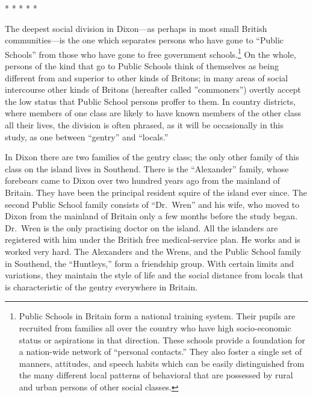 \documentclass[twoside,symmetric,nobib,justified]{tufte-book}
\begin{document}
\vspace{.2in}
\begin{centering}

\Large{* * * * *}

\end{centering}
\vspace{.17in}

\noindent The deepest social division in Dixon---as perhaps in most small British
communities---is the one which separates persons who have gone to
``Public Schools'' from those who have gone to free government
schools.\footnote{Public Schools in Britain form a national training
  system. Their pupils are recruited from families all over the country
  who have high socio-economic status or aspirations in that direction.
  These schools provide a foundation for a nation-wide network of
  ``personal contacts.'' They also foster a single set of manners,
  attitudes, and speech habits which can be easily distinguished from
  the many different local patterns of behavioral that are possessed by
  rural and urban persons of other social classes.} On the whole,
persons of the kind that go to Public Schools think of themselves as
being different from and superior to other kinds of Britons; in many
areas of social intercourse other kinds of Britons (hereafter called
''commoners'') overtly accept the low status that Public School persons
proffer to them. In country districts, where members of one class are
likely to have known members of the other class all their lives, the
division is often phrased, as it will be occasionally in this study, as
one between ``gentry'' and ``locals.''

In Dixon there are two families of the gentry class; the only other
family of this class on the island lives in Southend. There is the
``Alexander'' family, whose forebears came to Dixon over two hundred
years ago from the mainland of Britain. They have been the principal
resident squire of the island ever since. The second Public School
family consists of ``Dr.~Wren'' and his wife, who moved to Dixon from
the mainland of Britain only a few months before the study began.
Dr.~Wren is the only practising doctor on the island. All the islanders
are registered with him under the British free medical-service plan. He
works and is worked very hard. The Alexanders and the Wrens, and the
Public School family in Southend, the ``Huntleys,'' form a friendship
group. With certain limits and variations, they maintain the style of
life and the social distance from locals that is characteristic of the
gentry everywhere in Britain.
\end{document}
